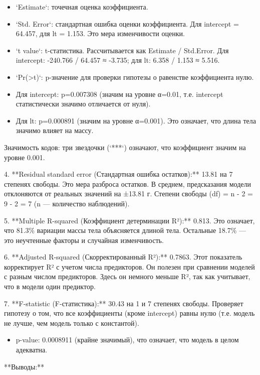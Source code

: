 \documentclass[
  letterpaper,
  DIV=11,
  numbers=noendperiod]{scrreprt}
\providecommand{\tightlist}{%
  \setlength{\itemsep}{0pt}\setlength{\parskip}{0pt}}
\begin{document}
\begin{itemize}
\item
  `Estimate`: точечная оценка коэффициента.
\item
  `Std. Error`: стандартная ошибка оценки коэффициента. Для intercept =
  64.457, для lt = 1.153. Это мера изменчивости оценки.
\item
  `t value`: t-статистика. Рассчитывается как Estimate / Std.Error. Для
  intercept: -240.766 / 64.457 ≈ -3.735; для lt: 6.358 / 1.153 ≈ 5.516.
\item
  `Pr(\textgreater\textbar t\textbar)`: p-значение для проверки гипотезы
  о равенстве коэффициента нулю.
\item
  Для intercept: p=0.007308 (значим на уровне α=0.01, т.е. intercept
  статистически значимо отличается от нуля).
\item
  Для lt: p=0.000891 (значим на уровне α=0.001). Это означает, что длина
  тела значимо влияет на массу.
\end{itemize}

Значимость кодов: три звездочки (`***`) означают, что коэффициент значим
на уровне 0.001.

4. **Residual standard error (Стандартная ошибка остатков):** 13.81 на 7
степенях свободы. Это мера разброса остатков. В среднем, предсказания
модели отклоняются от реальных значений на ±13.81 г. Степени свободы
(df) = n - 2 = 9 - 2 = 7 (n --- количество наблюдений).

5. **Multiple R-squared (Коэффициент детерминации R²):** 0.813. Это
означает, что 81.3\% вариации массы тела объясняется длиной тела.
Остальные 18.7\% --- это неучтенные факторы и случайная изменчивость.

6. **Adjusted R-squared (Скорректированный R²):** 0.7863. Этот
показатель корректирует R² с учетом числа предикторов. Он полезен при
сравнении моделей с разным числом предикторов. Здесь он немного меньше
R², так как учитывает, что в модели один предиктор.

7. **F-statistic (F-статистика):** 30.43 на 1 и 7 степенях свободы.
Проверяет гипотезу о том, что все коэффициенты (кроме intercept) равны
нулю (т.е. модель не лучше, чем модель только с константой).

\begin{itemize}
\tightlist
\item
  p-value: 0.0008911 (крайне значимый), что означает, что модель в целом
  адекватна.
\end{itemize}

**Выводы:**
\end{document}
